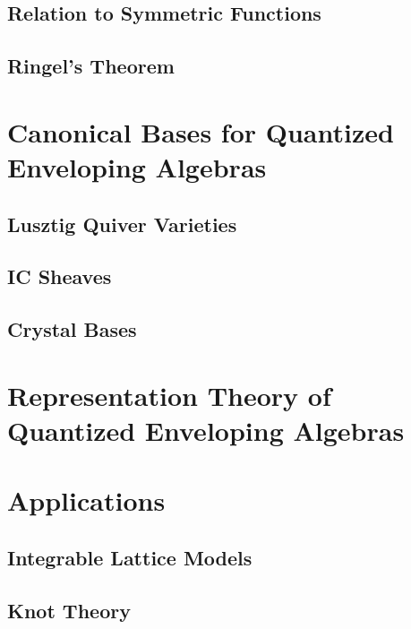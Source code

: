 \documentclass{book}
\begin{document}
  \section{Relation to Symmetric Functions}

  \section{Ringel's Theorem}


\chapter{Canonical Bases for Quantized Enveloping Algebras}

  \section{Lusztig Quiver Varieties}

  \section{IC Sheaves}

  \section{Crystal Bases}


\chapter{Representation Theory of Quantized Enveloping Algebras}


\chapter{Applications}

  \section{Integrable Lattice Models}

  \section{Knot Theory}
\end{document}
